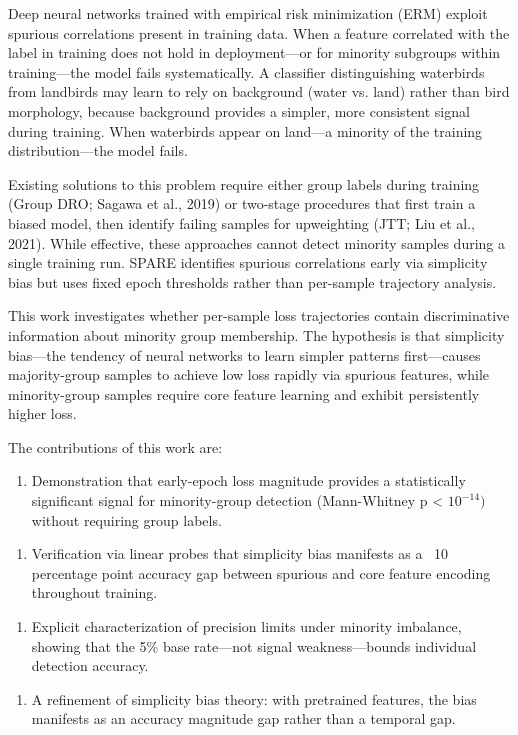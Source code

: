 
Deep neural networks trained with empirical risk minimization (ERM) exploit spurious correlations present in training data. When a feature correlated with the label in training does not hold in deployment---or for minority subgroups within training---the model fails systematically. A classifier distinguishing waterbirds from landbirds may learn to rely on background (water vs. land) rather than bird morphology, because background provides a simpler, more consistent signal during training. When waterbirds appear on land---a minority of the training distribution---the model fails.

Existing solutions to this problem require either group labels during training (Group DRO; Sagawa et al., 2019) or two-stage procedures that first train a biased model, then identify failing samples for upweighting (JTT; Liu et al., 2021). While effective, these approaches cannot detect minority samples during a single training run. SPARE \citep{Yang2023} identifies spurious correlations early via simplicity bias but uses fixed epoch thresholds rather than per-sample trajectory analysis.

This work investigates whether per-sample loss trajectories contain discriminative information about minority group membership. The hypothesis is that simplicity bias---the tendency of neural networks to learn simpler patterns first---causes majority-group samples to achieve low loss rapidly via spurious features, while minority-group samples require core feature learning and exhibit persistently higher loss.

The contributions of this work are:

\begin{enumerate}
\item Demonstration that early-epoch loss magnitude provides a statistically significant signal for minority-group detection (Mann-Whitney p < $10^{-14})$ without requiring group labels.
\end{enumerate}

\begin{enumerate}
\item Verification via linear probes that simplicity bias manifests as a ~10 percentage point accuracy gap between spurious and core feature encoding throughout training.
\end{enumerate}

\begin{enumerate}
\item Explicit characterization of precision limits under minority imbalance, showing that the 5\% base rate---not signal weakness---bounds individual detection accuracy.
\end{enumerate}

\begin{enumerate}
\item A refinement of simplicity bias theory: with pretrained features, the bias manifests as an accuracy magnitude gap rather than a temporal gap.
\end{enumerate}


